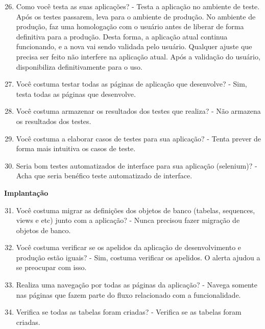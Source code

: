 \begin{anexosenv}
\begin{enumerate}
\setcounter{enumi}{25}
\item Como você testa as suas aplicações?\newline
- Testa a aplicação no ambiente de teste. Após os testes passarem, leva para o ambiente de produção. No ambiente de produção, faz uma homologação com o usuário antes de liberar de forma definitiva para a produção. Desta forma, a aplicação atual continua funcionando, e a nova vai sendo validada pelo usuário. Qualquer ajuste que precisa ser feito não interfere na aplicação atual. Após a validação do usuário, disponibiliza definitivamente para o uso.
\item Você costuma testar todas as páginas de aplicação que desenvolve?\newline
- Sim, testa todas as páginas que desenvolve.
\item Você costuma armazenar os resultados dos testes que realiza?\newline
- Não armazena os resultados dos testes.
\item Você costuma a elaborar casos de testes para sua aplicação?\newline
- Tenta prever de forma mais intuitiva os casos de teste.
\item Seria bom testes automatizados de interface para sua aplicação (selenium)?\newline
- Acha que seria benéfico teste automatizado de interface.
\end{enumerate}

\textbf{Implantação}

\begin{enumerate}
\setcounter{enumi}{30}
\item Você costuma migrar as definições dos objetos de banco (tabelas, sequences, views e
etc) junto com a aplicação?\newline
- Nunca precisou fazer migração de objetos de banco.
\item Você costuma verificar se os apelidos da aplicação de desenvolvimento e produção
estão iguais?\newline
- Sim, costuma verificar os apelidos. O alerta ajudou a se preocupar com isso.
\item Realiza uma navegação por todas as páginas da aplicação?\newline
- Navega somente nas páginas que fazem parte do fluxo relacionado com a funcionalidade.
\item Verifica se todas as tabelas foram criadas?\newline
- Verifica se as tabelas foram criadas.
\end{enumerate}


\end{anexosenv}
